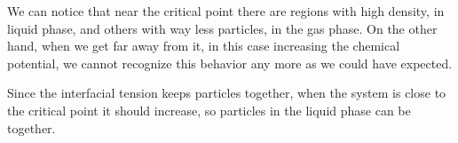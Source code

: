 \documentclass[10 pt]{article}
\begin{document}
We can notice that near the critical point there are regions with high density, in liquid phase, and others with way less particles, in the gas phase. On the other hand, when we get far away from it, in this case increasing the chemical potential, we cannot recognize this behavior any more as we could have expected.

Since the interfacial tension keeps particles together, when the system is close to the critical point it should increase, so particles in the liquid phase can be together.
\end{document}
